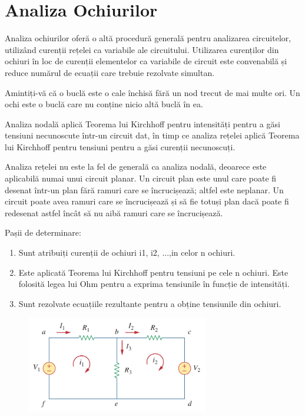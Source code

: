 \documentclass{article}
\begin{document}
\section{Analiza Ochiurilor}
\par Analiza ochiurilor oferă o altă procedură generală pentru analizarea circuitelor, utilizând curenții rețelei ca variabile ale circuitului. Utilizarea curenților din ochiuri în loc de curenții elementelor ca variabile de circuit este convenabilă și reduce numărul de ecuații care trebuie rezolvate simultan.
\par Amintiți-vă că o buclă este o cale închisă fără un nod trecut de mai multe ori. Un ochi este o buclă care nu conține nicio altă buclă în ea.
\par Analiza nodală aplică Teorema lui Kirchhoff pentru intensități pentru a găsi tensiuni necunoscute într-un circuit dat, în timp ce analiza rețelei aplică Teorema lui Kirchhoff pentru tensiuni pentru a găsi curenții necunoscuți.
\par Analiza rețelei nu este la fel de generală ca analiza nodală, deoarece este aplicabilă numai unui circuit planar. Un circuit plan este unul care poate fi desenat într-un plan fără ramuri care se încrucișează; altfel este neplanar. Un circuit poate avea ramuri care se încrucișează și să fie totuși plan dacă poate fi redesenat astfel încât să nu aibă ramuri care se încrucișează.
\par Pașii de determinare:
\begin{enumerate}
\item Sunt atribuiți curenții de ochiuri i1, i2, ...,in celor n ochiuri.
\item Este aplicată Teorema lui Kirchhoff pentru tensiuni pe cele n ochiuri. Este folosită legea lui Ohm pentru a exprima tensiunile în funcție de intensități.
\item Sunt rezolvate ecuațiile rezultante pentru a obține tensiunile din ochiuri.
\end{enumerate}


\begin{figure}[h]
\includegraphics[width=8cm]{fig2.png}
\centering
\end{figure}
\end{document}
